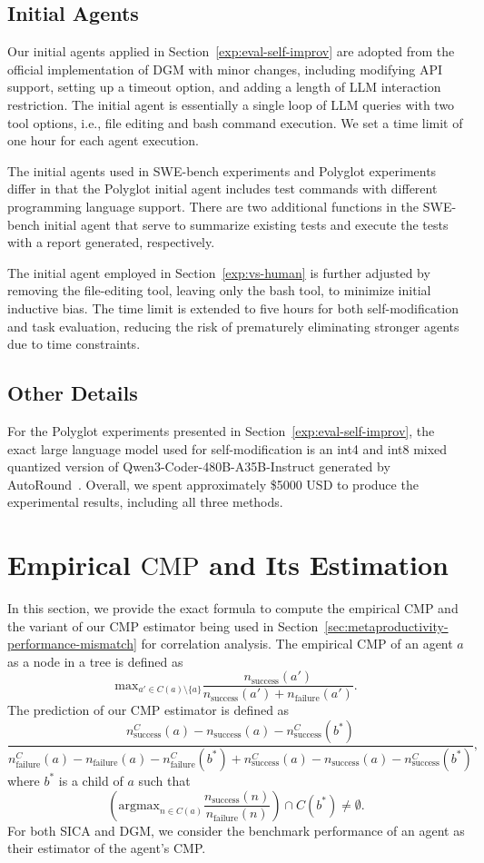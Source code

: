 \documentclass{article}
\begin{document}
\subsection{Initial Agents}
\label{app:exp}
Our initial agents applied in Section~\ref{exp:eval-self-improv} are adopted from the official implementation of DGM with minor changes, including modifying API support, setting up a timeout option, and adding a length of LLM interaction restriction. The initial agent is essentially a single loop of LLM queries with two tool options, i.e., file editing and bash command execution. We set a time limit of one hour for each agent execution.

The initial agents used in SWE-bench experiments and Polyglot experiments differ in that the Polyglot initial agent includes test commands with different programming language support. There are two additional functions in the SWE-bench initial agent that serve to summarize existing tests and execute the tests with a report generated, respectively.

The initial agent employed in Section~\ref{exp:vs-human} is further adjusted by removing the file-editing tool, leaving only the bash tool, to minimize initial inductive bias. The time limit is extended to five hours for both self-modification and task evaluation, reducing the risk of prematurely eliminating stronger agents due to time constraints.
\subsection{Other Details}
For the Polyglot experiments presented in Section~\ref{exp:eval-self-improv}, the exact large language model used for self-modification is an int4 and int8 mixed quantized version of Qwen3-Coder-480B-A35B-Instruct generated by AutoRound~\citep{intel_autoround}. 
Overall, we spent approximately \$5000 USD to produce the experimental results, including all three methods.

\newpage
\section{Empirical $\mathrm{CMP}$ and Its Estimation}\label{app:cmp_estimation}
In this section, we provide the exact formula to compute the empirical $\mathrm{CMP}$ and the variant of our $\mathrm{CMP}$ estimator being used in Section~\ref{sec:metaproductivity-performance-mismatch} for correlation analysis. The empirical $\mathrm{CMP}$ of an agent $a$ as a node in a tree is defined as 
\[
\text{max}_{a'\in C(a)\setminus \{a\}} \frac{n_\text{success}(a')}{n_\text{success}(a') + n_\text{failure}(a')}.
\]
The prediction of our $\mathrm{CMP}$ estimator is defined as
\[
\frac{n_\text{success}^C(a) - n_\text{success}(a) - n_\text{success}^C(b^*)}{n_\text{failure}^C(a) - n_\text{failure}(a) - n_\text{failure}^C(b^*) + n_\text{success}^C(a) - n_\text{success}(a) - n_\text{success}^C(b^*)},
\]
where $b^*$ is a child of $a$ such that
\[
\left( \text{argmax}_{n \in C(a)} \frac{n_\text{success}(n)}{n_\text{failure}(n)}\right) \cap {C(b^*)} \neq \emptyset.
\]
For both SICA and DGM, we consider the benchmark performance of an agent as their estimator of the agent's CMP.
\end{document}

